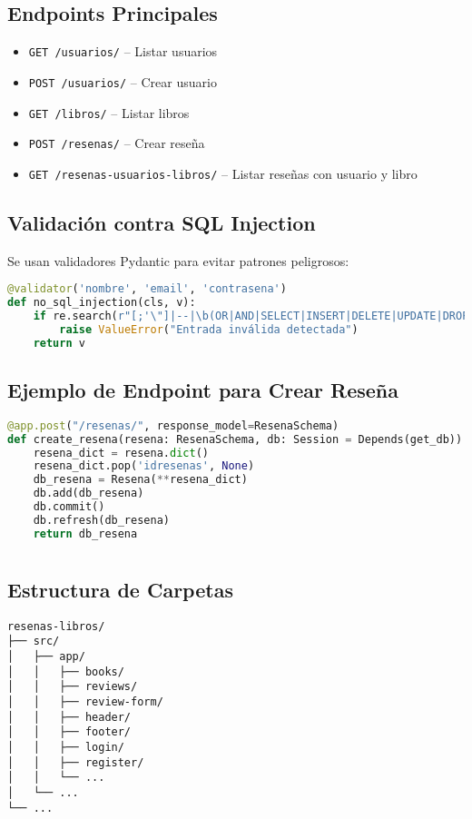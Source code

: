 \documentclass[10pt,a4paper]{article}
\begin{document}
\subsection{Endpoints Principales}
\begin{itemize}
    \item \texttt{GET /usuarios/} -- Listar usuarios
    \item \texttt{POST /usuarios/} -- Crear usuario
    \item \texttt{GET /libros/} -- Listar libros
    \item \texttt{POST /resenas/} -- Crear reseña
    \item \texttt{GET /resenas-usuarios-libros/} -- Listar reseñas con usuario y libro
\end{itemize}

\subsection{Validación contra SQL Injection}
Se usan validadores Pydantic para evitar patrones peligrosos:
\begin{lstlisting}[language=Python]
@validator('nombre', 'email', 'contrasena')
def no_sql_injection(cls, v):
    if re.search(r"[;'\"]|--|\b(OR|AND|SELECT|INSERT|DELETE|UPDATE|DROP|UNION)\b", v, re.IGNORECASE):
        raise ValueError("Entrada inválida detectada")
    return v
\end{lstlisting}

\subsection{Ejemplo de Endpoint para Crear Reseña}
\begin{lstlisting}[language=Python]
@app.post("/resenas/", response_model=ResenaSchema)
def create_resena(resena: ResenaSchema, db: Session = Depends(get_db)):
    resena_dict = resena.dict()
    resena_dict.pop('idresenas', None)
    db_resena = Resena(**resena_dict)
    db.add(db_resena)
    db.commit()
    db.refresh(db_resena)
    return db_resena
\end{lstlisting}

\section{\color{colorIPN}{Frontend: Angular}}

\subsection{Estructura de Carpetas}
\begin{verbatim}
resenas-libros/
├── src/
│   ├── app/
│   │   ├── books/
│   │   ├── reviews/
│   │   ├── review-form/
│   │   ├── header/
│   │   ├── footer/
│   │   ├── login/
│   │   ├── register/
│   │   └── ...
│   └── ...
└── ...
\end{verbatim}
\end{document}
